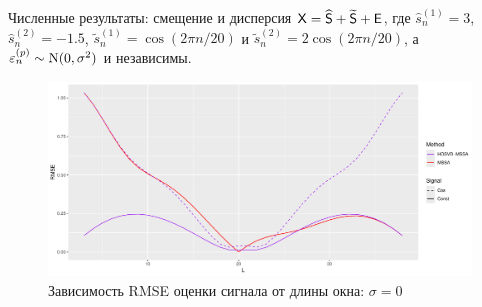 \documentclass[pdf, unicode, 9pt, notheorems, handout]{beamer}
\begin{document}
    \begin{frame}{Численные результаты: смещение и дисперсия}
        $\mathsf{X} = \widehat{\mathsf{S}} + \widetilde{\mathsf{S}} + \mathsf{E}$,
        где $\hat{s}_n^{(1)} = 3$, $\hat{s}_n^{(2)} = -1.5$,
        $\tilde{s}_n^{(1)} = \cos(2\pi n / 20)$ и $\tilde{s}_n^{(2)} = 2\cos(2\pi n / 20)$, 
        а $\varepsilon_n^{(p)}\sim \mathrm{N}(0, \sigma^2)$ и независимы. 
        \begin{figure}
            \centering
            \includegraphics[width=\linewidth]{./img/approx_sep_no_noise}
            \caption{Зависимость RMSE оценки сигнала от длины окна: $\sigma = 0$}
        \end{figure}
    \end{frame}
\end{document}

